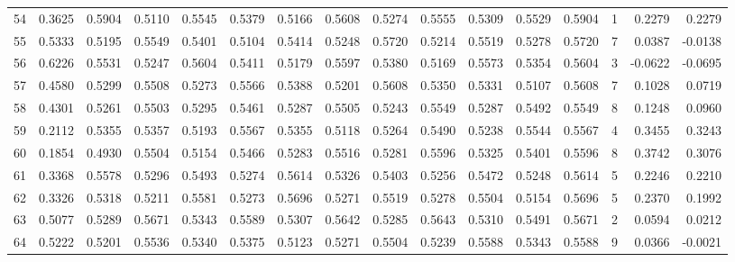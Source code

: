 \begin{tabular}{lrrrrrrrrrrrrrrr}
54  &      0.3625 &  0.5904 &  0.5110 &  0.5545 &  0.5379 &  0.5166 &  0.5608 &  0.5274 &  0.5555 &  0.5309 &   0.5529 &     0.5904 &      1 &                    0.2279 &                     0.2279 \\
55  &      0.5333 &  0.5195 &  0.5549 &  0.5401 &  0.5104 &  0.5414 &  0.5248 &  0.5720 &  0.5214 &  0.5519 &   0.5278 &     0.5720 &      7 &                    0.0387 &                    -0.0138 \\
56  &      0.6226 &  0.5531 &  0.5247 &  0.5604 &  0.5411 &  0.5179 &  0.5597 &  0.5380 &  0.5169 &  0.5573 &   0.5354 &     0.5604 &      3 &                   -0.0622 &                    -0.0695 \\
57  &      0.4580 &  0.5299 &  0.5508 &  0.5273 &  0.5566 &  0.5388 &  0.5201 &  0.5608 &  0.5350 &  0.5331 &   0.5107 &     0.5608 &      7 &                    0.1028 &                     0.0719 \\
58  &      0.4301 &  0.5261 &  0.5503 &  0.5295 &  0.5461 &  0.5287 &  0.5505 &  0.5243 &  0.5549 &  0.5287 &   0.5492 &     0.5549 &      8 &                    0.1248 &                     0.0960 \\
59  &      0.2112 &  0.5355 &  0.5357 &  0.5193 &  0.5567 &  0.5355 &  0.5118 &  0.5264 &  0.5490 &  0.5238 &   0.5544 &     0.5567 &      4 &                    0.3455 &                     0.3243 \\
60  &      0.1854 &  0.4930 &  0.5504 &  0.5154 &  0.5466 &  0.5283 &  0.5516 &  0.5281 &  0.5596 &  0.5325 &   0.5401 &     0.5596 &      8 &                    0.3742 &                     0.3076 \\
61  &      0.3368 &  0.5578 &  0.5296 &  0.5493 &  0.5274 &  0.5614 &  0.5326 &  0.5403 &  0.5256 &  0.5472 &   0.5248 &     0.5614 &      5 &                    0.2246 &                     0.2210 \\
62  &      0.3326 &  0.5318 &  0.5211 &  0.5581 &  0.5273 &  0.5696 &  0.5271 &  0.5519 &  0.5278 &  0.5504 &   0.5154 &     0.5696 &      5 &                    0.2370 &                     0.1992 \\
63  &      0.5077 &  0.5289 &  0.5671 &  0.5343 &  0.5589 &  0.5307 &  0.5642 &  0.5285 &  0.5643 &  0.5310 &   0.5491 &     0.5671 &      2 &                    0.0594 &                     0.0212 \\
64  &      0.5222 &  0.5201 &  0.5536 &  0.5340 &  0.5375 &  0.5123 &  0.5271 &  0.5504 &  0.5239 &  0.5588 &   0.5343 &     0.5588 &      9 &                    0.0366 &                    -0.0021 \\

\end{tabular}
